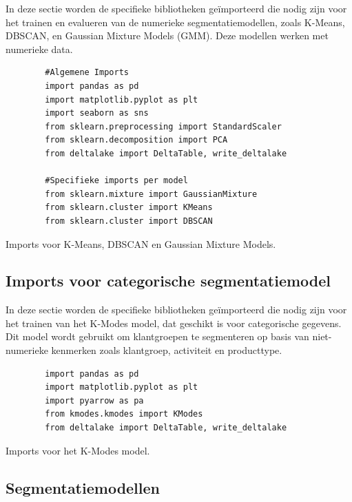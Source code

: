 In deze sectie worden de specifieke bibliotheken geïmporteerd die nodig zijn voor het trainen en evalueren van de numerieke segmentatiemodellen, zoals K-Means, DBSCAN, en Gaussian Mixture Models (GMM). Deze modellen werken met numerieke data.

\vspace{1em}

\begin{listing}[H]
    \begin{verbatim}
        #Algemene Imports
        import pandas as pd
        import matplotlib.pyplot as plt
        import seaborn as sns
        from sklearn.preprocessing import StandardScaler
        from sklearn.decomposition import PCA
        from deltalake import DeltaTable, write_deltalake
        
        #Specifieke imports per model
        from sklearn.mixture import GaussianMixture
        from sklearn.cluster import KMeans
        from sklearn.cluster import DBSCAN
    \end{verbatim}
    \caption[Imports voor numerieke segmentatiemodellen]{Imports voor K-Means, DBSCAN en Gaussian Mixture Models.}
\end{listing}

\subsection*{Imports voor categorische segmentatiemodel}

In deze sectie worden de specifieke bibliotheken geïmporteerd die nodig zijn voor het trainen van het K-Modes model, dat geschikt is voor categorische gegevens. Dit model wordt gebruikt om klantgroepen te segmenteren op basis van niet-numerieke kenmerken zoals klantgroep, activiteit en producttype.

\vspace{1em}

\begin{listing}[H]
    \begin{verbatim}
        import pandas as pd
        import matplotlib.pyplot as plt
        import pyarrow as pa
        from kmodes.kmodes import KModes
        from deltalake import DeltaTable, write_deltalake
    \end{verbatim}
    \caption[Imports voor K-Modes segmentatiemodel]{Imports voor het K-Modes model.}
\end{listing}


\newpage

\subsection{Segmentatiemodellen}

